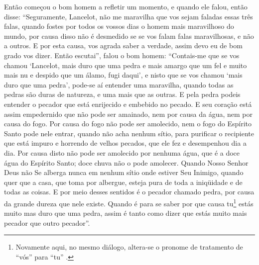 Então começou o bom homem a refletir um momento, e quando ele falou, então
disse: “Seguramente, Lancelot, não me maravilha que vos sejam faladas essas
três falas, quando fostes por todos os vossos dias o homem mais maravilhoso do
mundo, por causa disso não é desmedido se se vos falam falas maravilhosas, e
não a outros. E por esta causa, vos agrada saber a verdade, assim devo eu de
bom grado vos dizer. Então escutai”, falou o bom homem: “Contais-me que se vos
chamou ‘Lancelot, mais duro que uma pedra e mais amargo que um fel e muito
mais nu e despido que um álamo, fugi daqui’, e nisto que se vos chamou ‘mais
duro que uma pedra’, pode-se aí entender uma maravilha, quando todas as pedras
são duras de natureza, e uma mais que as outras. E pela pedra podeis entender o
pecador que está enrijecido e embebido no pecado. E seu coração está assim
empedernido que não pode ser amainado, nem por causa da água, nem por causa do
fogo. Por causa do fogo não pode ser amolecido, nem o fogo do Espírito Santo
pode nele entrar, quando não acha nenhum sítio, para purificar o recipiente que
está impuro e horrendo de velhos pecados, que ele fez e desempenhou dia a dia.
Por causa disto não pode ser amolecido por nenhuma água,  que é a doce água do
Espírito Santo; doce chuva não o pode amolecer. Quando Nosso Senhor Deus não Se
alberga nunca em nenhum sítio onde estiver Seu Inimigo, quando quer que a casa,
que toma por albergue, esteja pura de toda a iniqüidade e de todas as coisas. E
por meio desses sentidos é o pecador chamado pedra, por causa da grande dureza
que nele existe. Quando é para se saber por que causa tu\footnote{ Novamente
aqui, no mesmo diálogo, altera-se o pronome de tratamento de “vós”
 para “tu” .}  estás muito mas duro que
uma pedra, assim é tanto como dizer que estás muito mais pecador que outro
pecador”. 

